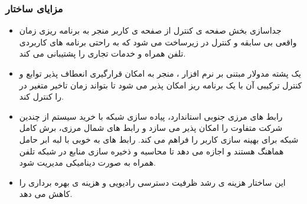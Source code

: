 \subsubsection{مزایای ساختار }
\begin{itemize}
\item 
جداسازی بخش صفحه ی کنترل از 
صفحه ی کاربر 
منجر به 
برنامه ریزی زمان واقعی بی سابقه و کنترل در زیرساخت  می شود که به راحتی برنامه های کاربردی تلفن همراه و خدمات تجاری را پشتیبانی می کند.
\item 
یک پشته  مدولار مبتنی بر نرم افزار ، منجر به امکان قرارگیری انعطاف پذیر توابع  و کنترل ترکیبی آن با یک برنامه ریز امکان پذیر می شود تا بتواند زمان تاخیر متغیر در  را کنترل کند.
\item 
رابط های مرزی جنوبی استاندارد، پیاده سازی شبکه با خرید سیستم از چندین شرکت متفاوت را امکان پذیر می سازد و رابط های شمال مرزی، برش کامل شبکه برای بهینه سازی   کاربر را فراهم می کند.
رابط های  به خوبی با لبه ابر حامل هماهنگ هستند و اجازه می دهد تا  محاسبه و ذخیره سازی منابع در شبکه تلفن همراه 
به صورت دینامیکی مدیریت شود.
\item 
این ساختار هزینه ی رشد ظرفیت دسترسی رادیویی و هزینه ی بهره برداری را کاهش می دهد.
\end{itemize}
